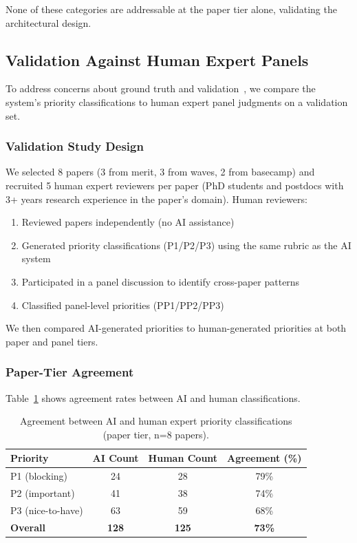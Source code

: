 None of these categories are addressable at the paper tier alone, validating the architectural design.

\subsection{Validation Against Human Expert Panels}
\label{sec:validation}

To address concerns about ground truth and validation~\cite{liang2023helm}, we compare the system's priority classifications to human expert panel judgments on a validation set.

\subsubsection{Validation Study Design}

We selected 8 papers (3 from merit, 3 from waves, 2 from basecamp) and recruited 5 human expert reviewers per paper (PhD students and postdocs with 3+ years research experience in the paper's domain). Human reviewers:
\begin{enumerate}
\item Reviewed papers independently (no AI assistance)
\item Generated priority classifications (P1/P2/P3) using the same rubric as the AI system
\item Participated in a panel discussion to identify cross-paper patterns
\item Classified panel-level priorities (PP1/PP2/PP3)
\end{enumerate}

We then compared AI-generated priorities to human-generated priorities at both paper and panel tiers.

\subsubsection{Paper-Tier Agreement}

Table~\ref{tab:human-agreement} shows agreement rates between AI and human classifications.

\begin{table}[t]
\centering
\caption{Agreement between AI and human expert priority classifications (paper tier, n=8 papers).}
\label{tab:human-agreement}
\begin{tabular}{lccc}
\toprule
Priority & AI Count & Human Count & Agreement (\%) \\
\midrule
P1 (blocking) & 24 & 28 & 79\% \\
P2 (important) & 41 & 38 & 74\% \\
P3 (nice-to-have) & 63 & 59 & 68\% \\
\midrule
\textbf{Overall} & \textbf{128} & \textbf{125} & \textbf{73\%} \\
\bottomrule
\end{tabular}
\end{table}

